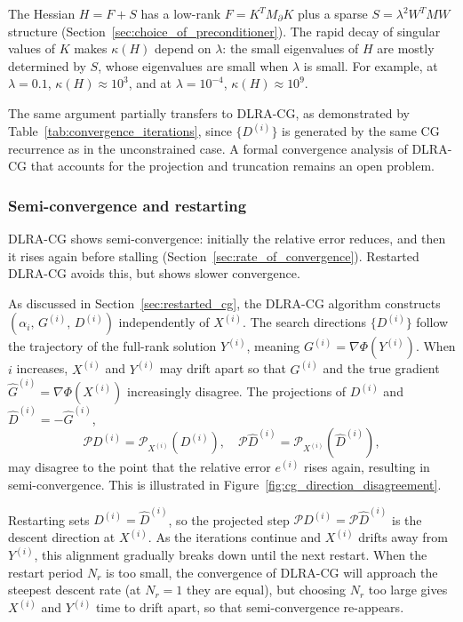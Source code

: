 The Hessian $H = F + S$ has a low-rank $F = K^T M_\partial K$ plus a sparse $S = \lambda^2 W^T M W$ structure (Section~\ref{sec:choice_of_preconditioner}). The rapid decay of singular values of $K$ makes $\kappa(H)$ depend on $\lambda$: the small eigenvalues of $H$ are mostly determined by $S$, whose eigenvalues are small when $\lambda$ is small. For example, at $\lambda = 0.1$, $\kappa(H) \approx 10^3$, and at  $\lambda = 10^{-4}$, $\kappa(H) \approx 10^9$.

The same argument partially transfers to DLRA-CG, as demonstrated by Table~\ref{tab:convergence_iterations}, since $\{D^{(i)}\}$ is generated by the same CG recurrence as in the unconstrained case. A formal convergence analysis of DLRA-CG that accounts for the projection and truncation remains an open problem.


\subsubsection{Semi-convergence and restarting}

DLRA-CG shows semi-convergence: initially the relative error reduces, and then it rises again before stalling (Section~\ref{sec:rate_of_convergence}). Restarted DLRA-CG avoids this, but shows slower convergence.

As discussed in Section~\ref{sec:restarted_cg}, the DLRA-CG algorithm constructs $(\alpha_i,\, G^{(i)},\, D^{(i)})$ independently of $X^{(i)}$. The search directions $\{D^{(i)}\}$ follow the trajectory of the full-rank solution $Y^{(i)}$, meaning $G^{(i)} = \nabla \Phi(Y^{(i)})$. When $i$ increases, $X^{(i)}$ and $Y^{(i)}$ may drift apart so that $G^{(i)}$ and the true gradient $\hat G^{(i)} = \nabla \Phi(X^{(i)})$ increasingly disagree. The projections of $D^{(i)}$ and $\hat D^{(i)} = -\hat G^{(i)}$,
\begin{equation*}
    \mathcal{P} D^{(i)}
    = \mathcal{P}_{X^{(i)}}(D^{(i)}),\quad
    \mathcal{P} \hat D^{(i)}
    = \mathcal{P}_{X^{(i)}}(\hat D^{(i)}),
\end{equation*}
may disagree to the point that the relative error $e^{(i)}$ rises again, resulting in semi-convergence. This is illustrated in Figure~\ref{fig:cg_direction_disagreement}.

Restarting sets $D^{(i)} = \hat D^{(i)}$, so the projected step $\mathcal{P}D^{(i)} = \mathcal{P}\hat D^{(i)}$ is the descent direction at $X^{(i)}$. As the iterations continue and $X^{(i)}$ drifts away from $Y^{(i)}$, this alignment gradually breaks down until the next restart. When the restart period $N_r$ is too small, the convergence of DLRA-CG will approach the steepest descent rate (at $N_r = 1$ they are equal), but choosing $N_r$ too large gives $X^{(i)}$ and $Y^{(i)}$ time to drift apart, so that semi-convergence re-appears.


